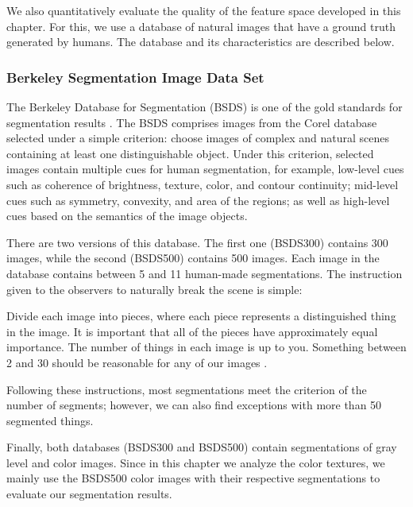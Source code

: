 We also quantitatively evaluate the quality of the feature space developed in this chapter. For this, we use a database of natural images that have a ground truth generated by humans. The database and its characteristics are described below.

\subsubsection{Berkeley Segmentation Image Data Set}
The Berkeley Database for Segmentation (BSDS) is one of the gold standards for segmentation results \citep{Martin.Fowlkes.ea:ICCV:2001}. The BSDS comprises images from the Corel database selected under a simple criterion: choose images of complex and natural scenes containing at least one distinguishable object. Under this criterion, selected images contain multiple cues for human segmentation, for example, low-level cues such as coherence of brightness, texture, color, and contour continuity; mid-level cues such as symmetry, convexity, and area of the regions; as well as high-level cues based on the semantics of the image objects.

There are two versions of this database. The first one (BSDS300) contains 300 images, while the second (BSDS500) contains 500 images. Each image in the database contains between 5 and 11 human-made segmentations. The instruction given to the observers to naturally break the scene is simple:
\begin{displayquote}
Divide each image into pieces, where each piece represents a distinguished thing in the image. It is important that all of the pieces have approximately equal importance. The number of things in each image is up to you. Something between 2 and 30 should be reasonable for any of our images \citep{Martin.Fowlkes.ea:ICCV:2001}.
\end{displayquote}
Following these instructions, most segmentations meet the criterion of the number of segments; however, we can also find exceptions with more than 50 segmented things.

Finally, both databases (BSDS300 and BSDS500) contain segmentations of gray level and color images. Since in this chapter we analyze the color textures, we mainly use the BSDS500 color images with their respective segmentations to evaluate our segmentation results. 

